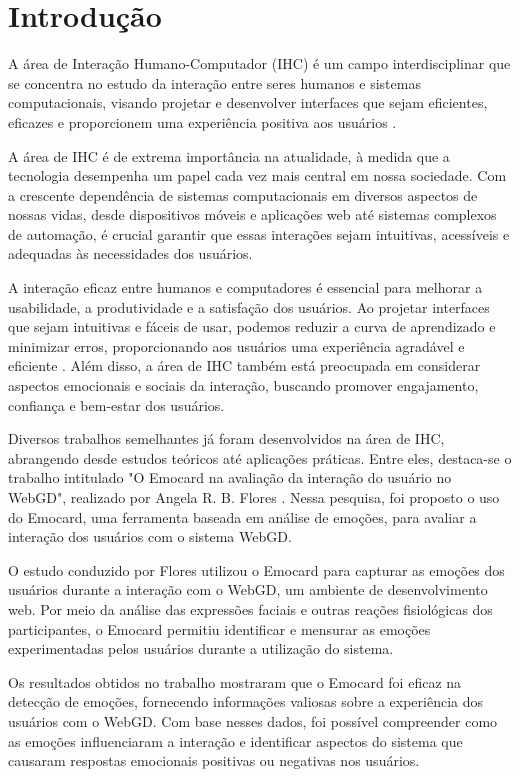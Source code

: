 \chapter{Introdução}

A área de Interação Humano-Computador (IHC) é um campo interdisciplinar que se concentra no estudo da interação entre seres humanos e sistemas computacionais, visando projetar e desenvolver interfaces que sejam eficientes, eficazes e proporcionem uma experiência positiva aos usuários \cite{1}.

A área de IHC é de extrema importância na atualidade, à medida que a tecnologia desempenha um papel cada vez mais central em nossa sociedade. Com a crescente dependência de sistemas computacionais em diversos aspectos de nossas vidas, desde dispositivos móveis e aplicações web até sistemas complexos de automação, é crucial garantir que essas interações sejam intuitivas, acessíveis e adequadas às necessidades dos usuários.

A interação eficaz entre humanos e computadores é essencial para melhorar a usabilidade, a produtividade e a satisfação dos usuários. Ao projetar interfaces que sejam intuitivas e fáceis de usar, podemos reduzir a curva de aprendizado e minimizar erros, proporcionando aos usuários uma experiência agradável e eficiente \cite{2}. Além disso, a área de IHC também está preocupada em considerar aspectos emocionais e sociais da interação, buscando promover engajamento, confiança e bem-estar dos usuários.

Diversos trabalhos semelhantes já foram desenvolvidos na área de IHC, abrangendo desde estudos teóricos até aplicações práticas. Entre eles, destaca-se o trabalho intitulado "O Emocard na avaliação da interação do usuário no WebGD", realizado por Angela R. B. Flores \cite{3}. Nessa pesquisa, foi proposto o uso do Emocard, uma ferramenta baseada em análise de emoções, para avaliar a interação dos usuários com o sistema WebGD.

O estudo conduzido por Flores utilizou o Emocard para capturar as emoções dos usuários durante a interação com o WebGD, um ambiente de desenvolvimento web. Por meio da análise das expressões faciais e outras reações fisiológicas dos participantes, o Emocard permitiu identificar e mensurar as emoções experimentadas pelos usuários durante a utilização do sistema.

Os resultados obtidos no trabalho mostraram que o Emocard foi eficaz na detecção de emoções, fornecendo informações valiosas sobre a experiência dos usuários com o WebGD. Com base nesses dados, foi possível compreender como as emoções influenciaram a interação e identificar aspectos do sistema que causaram respostas emocionais positivas ou negativas nos usuários.

